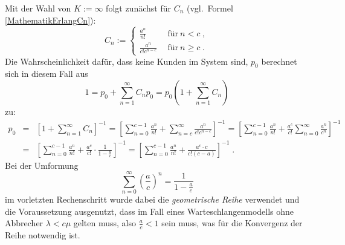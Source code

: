 \documentclass[a4paper,11pt,oneside]{article}
\theoremstyle{definition}
\begin{document}
Mit der Wahl von $K:=\infty$ folgt zunächst für $C_n$ (vgl.\ Formel \eqref{MathematikErlangCn}):
\begin{equation*}
C_n:=\left\{\begin{array}{ll}
\displaystyle \frac{a^n}{n!}&~~\textrm{für}~n<c\;,\\
\displaystyle \frac{a^n}{c!c^{n-c}}&~~\textrm{für}~n\ge c\;.
\end{array}\right.
\end{equation*}
Die Wahrscheinlichkeit dafür, dass keine Kunden im System sind, $p_0$ berechnet sich in diesem Fall aus
$$
1=
p_0+\sum_{n=1}^\infty C_np_0=
p_0\left(1+\sum_{n=1}^\infty C_n\right)
$$
zu:
\begin{eqnarray*}
p_0&=&
\left[1+\sum_{n=1}^\infty C_n\right]^{-1}=
\left[\sum_{n=0}^{c-1}\frac{a^n}{n!}+\sum_{n=c}^\infty\frac{a^n}{c!c^{n-c}}\right]^{-1}=
\left[\sum_{n=0}^{c-1}\frac{a^n}{n!}+\frac{a^c}{c!}\sum_{n=0}^\infty\frac{a^n}{c^n}\right]^{-1}\\&=&
\left[\sum_{n=0}^{c-1}\frac{a^n}{n!}+\frac{a^c}{c!}\cdot\frac{1}{1-\frac{a}{c}}\right]^{-1}=
\left[\sum_{n=0}^{c-1}\frac{a^n}{n!}+\frac{a^c\cdot c}{c!(c-a)}\right]^{-1}\;.
\end{eqnarray*}
Bei der Umformung
$$
\sum_{n=0}^\infty\left(\frac{a}{c}\right)^n=\frac{1}{1-\frac{a}{c}}
$$
im vorletzten Rechenschritt wurde dabei die \emph{geometrische Reihe} verwendet und die Voraussetzung ausgenutzt, dass im Fall eines Warteschlangenmodells ohne Abbrecher $\lambda<c\mu$ gelten muss, also $\frac{a}{c}<1$ sein muss, was für die Konvergenz der Reihe notwendig ist.
\end{document}
